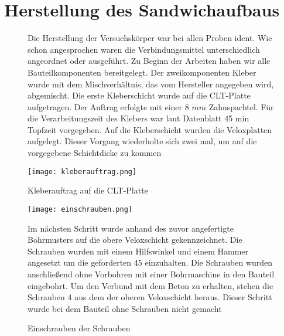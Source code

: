 \documentclass[12 pt,a4 paper ]{scrreprt}
\begin{document}
\section{Herstellung des Sandwichaufbaus}


\begin{figure}[h!]
	\begin{minipage}[h]{7cm}	
	 Die Herstellung der Versuchskörper war bei allen Proben ident. Wie schon angesprochen 	waren die Verbindungsmittel unterschiedlich angeordnet oder ausgeführt.
	Zu Beginn der Arbeiten haben wir alle Bauteilkomponenten bereitgelegt. Der 					zweikomponenten Kleber wurde mit dem Mischverhältnis, das vom Hersteller angegeben 			wird, abgemischt. Die erste Kleberschicht wurde auf die CLT-Platte aufgetragen. Der 		Auftrag erfolgte mit einer  8 $mm$ Zahnspachtel. Für die Verarbeitungszeit des Klebers 		war laut Datenblatt 45 min Topfzeit vorgegeben. Auf die Kleberschicht wurden die 			Veloxplatten aufgelegt. Dieser Vorgang wiederholte sich zwei mal, um auf die 				vorgegebene Schichtdicke zu kommen
	\end{minipage}
		\hfill
	\begin{minipage}[h]{7cm}
		\texttt{[image: kleberauftrag.png]}
			\caption{Kleberauftrag auf die CLT-Platte}
			\label{kleberauftrag}
	\end{minipage}
\end{figure}



\begin{figure}[h!]
\begin{minipage}[h]{7cm}
	\texttt{[image: einschrauben.png]}
	\caption{Einschrauben der Schrauben}
	\label{einschrauben}
\end{minipage}
\hfill
\begin{minipage}[h]{7cm}
Im nächsten Schritt wurde anhand des zuvor angefertigte Bohrmusters auf die obere Veloxschicht gekennzeichnet. Die Schrauben wurden mit einem Hilfswinkel und einem Hammer angesetzt um die geforderten 45 einzuhalten. Die Schrauben wurden anschließend ohne Vorbohren mit einer Bohrmaschine in den Bauteil eingebohrt. Um den Verbund mit dem Beton zu erhalten, stehen die  Schrauben 4 aus dem der oberen Veloxschicht heraus. Dieser Schritt wurde bei dem Bauteil ohne Schrauben nicht gemacht
	
\end{minipage}
\end{figure}
\end{document}
